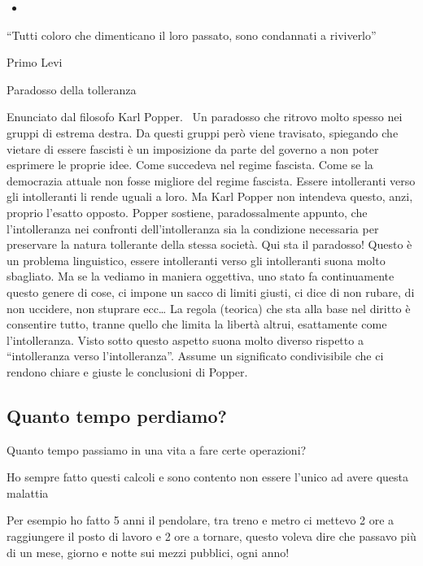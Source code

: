 \documentclass[12pt]{book} %
\begin{document}
\begin{itemize}
\begin{itemize}
\item[] 
\bigskip
\end{itemize}
\end{itemize}
“Tutti coloro che dimenticano il loro passato, sono condannati a riviverlo”

Primo Levi


\bigskip
\begin{mdframed}[linewidth=1pt]
Paradosso della tolleranza

Enunciato dal filosofo Karl Popper. \ Un paradosso che ritrovo molto spesso nei gruppi di estrema destra. Da questi
gruppi però viene travisato, spiegando che vietare di essere fascisti è un imposizione da parte del governo a non poter
esprimere le proprie idee. Come succedeva nel regime fascista. Come se la democrazia attuale non fosse migliore del
regime fascista. Essere intolleranti verso gli intolleranti li rende uguali a loro. Ma Karl Popper non intendeva
questo, anzi, proprio l'esatto opposto. Popper sostiene, paradossalmente appunto, che
l'intolleranza nei confronti dell'intolleranza sia la condizione necessaria per preservare la natura tollerante della
stessa società. Qui sta il paradosso! Questo è un problema linguistico, essere intolleranti verso gli intolleranti
suona molto sbagliato. Ma se la vediamo in maniera oggettiva, uno stato fa continuamente questo genere di cose, ci
impone un sacco di limiti giusti, ci dice di non rubare, di non uccidere, non stuprare ecc… La regola (teorica) che sta
alla base nel diritto è consentire tutto, tranne quello che limita la libertà altrui, esattamente come
l'intolleranza. Visto sotto questo aspetto suona molto diverso rispetto a “intolleranza verso
l'intolleranza”. Assume un significato condivisibile che ci rendono chiare e giuste le conclusioni
di Popper.
\end{mdframed}
\subsection{Quanto tempo perdiamo?}
Quanto tempo passiamo in una vita a fare certe operazioni?

Ho sempre fatto questi calcoli e sono contento non essere l'unico ad avere questa
malattia

Per esempio ho fatto 5 anni il pendolare, tra treno e metro ci mettevo 2 ore a raggiungere il posto di lavoro e 2 ore a
tornare, questo voleva dire che passavo più di un mese, giorno e notte sui mezzi pubblici, ogni anno!
\end{document}
